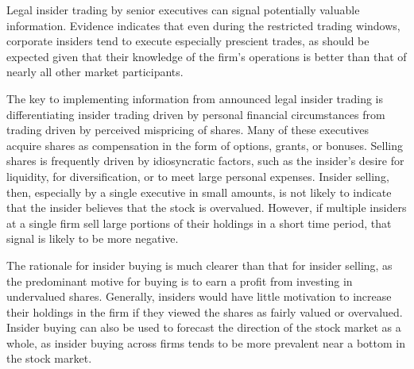 \documentclass[11pt]{article}
\begin{document}
Legal insider trading by senior executives can signal potentially valuable information. Evidence indicates that even during the restricted trading windows, corporate insiders tend to execute especially prescient trades, as should be expected given that their knowledge of the firm's operations is better than that of nearly all other market participants.

The key to implementing information from announced legal insider trading is differentiating insider trading driven by personal financial circumstances from trading driven by perceived mispricing of shares. Many of these executives acquire shares as compensation in the form of options, grants, or bonuses. Selling shares is frequently driven by idiosyncratic factors, such as the insider's desire for liquidity, for diversification, or to meet large personal expenses. Insider selling, then, especially by a single executive in small amounts, is not likely to indicate that the insider believes that the stock is overvalued. However, if multiple insiders at a single firm sell large portions of their holdings in a short time period, that signal is likely to be more negative.

The rationale for insider buying is much clearer than that for insider selling, as the predominant motive for buying is to earn a profit from investing in undervalued shares. Generally, insiders would have little motivation to increase their holdings in the firm if they viewed the shares as fairly valued or overvalued. Insider buying can also be used to forecast the direction of the stock market as a whole, as insider buying across firms tends to be more prevalent near a bottom in the stock market.
\end{document}
